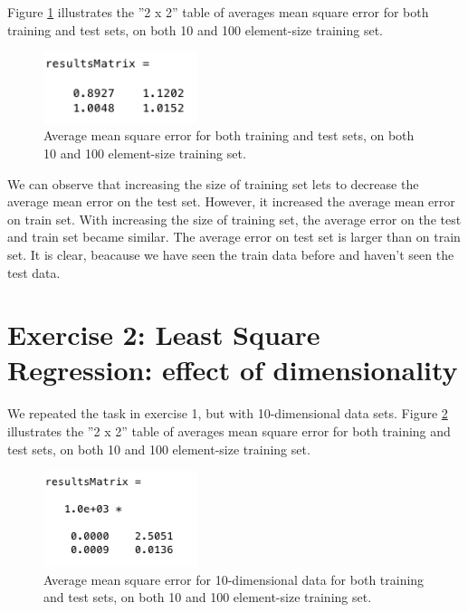 \documentclass{article} %
\begin{document}
Figure \ref{fig:resultMatrix1} illustrates the ''2 x 2'' table of averages mean square error for both training and test sets, on both 10 and 100 element-size training set.
\begin{figure}[H]
\begin{center}
\includegraphics[width=0.4\textwidth]{resultsMatrix}
\end{center}
\caption{Average mean square error for both training and test sets, on both 10 and 100 element-size training set.}
\label{fig:resultMatrix1}
\end{figure}

We can observe that increasing the size of training set lets to decrease the average mean error on the test set.
However, it increased the average mean error on train set.
With increasing the size of training set, the average error on the test and train set became similar.
The average error on test set is larger than on train set. It is clear, beacause we have seen the train data before and haven't seen the test data.
\section{Exercise 2: Least Square Regression: effect of dimensionality}
We repeated the task in exercise 1, but with 10-dimensional data sets. Figure \ref{fig:resultMatrix2} illustrates the ''2 x 2'' table of averages mean square error for both training and test sets, on both 10 and 100 element-size training set.
\begin{figure}[H]
\begin{center}
\includegraphics[width=0.4\textwidth]{resultsMatrix2}
\end{center}
\caption{Average mean square error for 10-dimensional data for both training and test sets, on both 10 and 100 element-size training set.}
\label{fig:resultMatrix2}
\end{figure}
\end{document}
